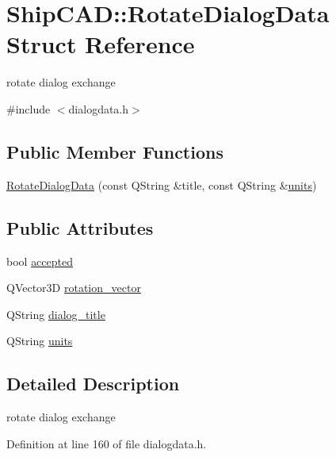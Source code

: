 \hypertarget{structShipCAD_1_1RotateDialogData}{}\section{Ship\+C\+AD\+:\+:Rotate\+Dialog\+Data Struct Reference}
\label{structShipCAD_1_1RotateDialogData}


rotate dialog exchange  




{\ttfamily \#include $<$dialogdata.\+h$>$}

\subsection*{Public Member Functions}
\begin{DoxyCompactItemize}
\item 
\hyperlink{structShipCAD_1_1RotateDialogData_a9314bfd6204d624e7141d76ee8e17e3a}{Rotate\+Dialog\+Data} (const Q\+String \&title, const Q\+String \&\hyperlink{structShipCAD_1_1RotateDialogData_a893de613d61c0c377dbbd1cee8cb6c19}{units})
\end{DoxyCompactItemize}
\subsection*{Public Attributes}
\begin{DoxyCompactItemize}
\item 
bool \hyperlink{structShipCAD_1_1RotateDialogData_a1e134e74a944807a063ac663526b0789}{accepted}
\item 
Q\+Vector3D \hyperlink{structShipCAD_1_1RotateDialogData_a53bd3533c7fd9e82d9298cbba080a430}{rotation\+\_\+vector}
\item 
Q\+String \hyperlink{structShipCAD_1_1RotateDialogData_af8648790d9c834ad4c65e3a188290738}{dialog\+\_\+title}
\item 
Q\+String \hyperlink{structShipCAD_1_1RotateDialogData_a893de613d61c0c377dbbd1cee8cb6c19}{units}
\end{DoxyCompactItemize}


\subsection{Detailed Description}
rotate dialog exchange 

Definition at line 160 of file dialogdata.\+h.



